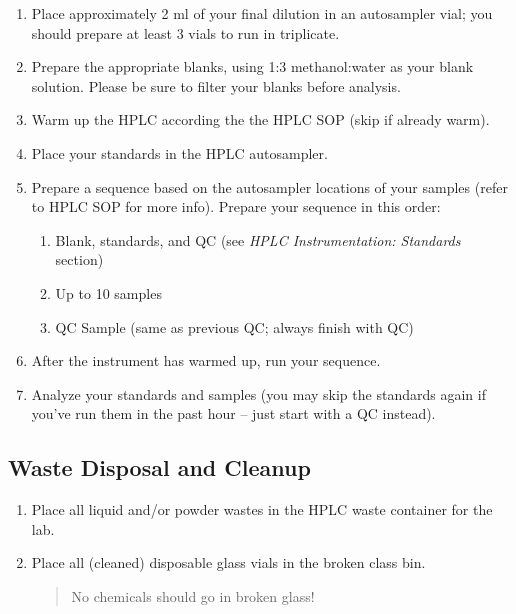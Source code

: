 \documentclass[]{tufte-book}
\providecommand{\tightlist}{%
  \setlength{\itemsep}{0pt}\setlength{\parskip}{0pt}}
\begin{document}
\begin{enumerate}
\def\labelenumi{\arabic{enumi}.}
\tightlist
\item
  Place approximately 2 ml of your final dilution in an autosampler vial; you should prepare at least 3 vials to run in triplicate.
\item
  Prepare the appropriate blanks, using 1:3 methanol:water as your blank solution. Please be sure to filter your blanks before analysis.
\item
  Warm up the HPLC according the the HPLC SOP (skip if already warm).
\item
  Place your standards in the HPLC autosampler.
\item
  Prepare a sequence based on the autosampler locations of your samples (refer to HPLC SOP for more info). Prepare your sequence in this order:

  \begin{enumerate}
  \def\labelenumii{\arabic{enumii}.}
  \tightlist
  \item
    Blank, standards, and QC (see \emph{HPLC \textbar{} Instrumentation: Standards} section)
  \item
    Up to 10 samples
  \item
    QC Sample (same as previous QC; always finish with QC)
  \end{enumerate}
\item
  After the instrument has warmed up, run your sequence.
\item
  Analyze your standards and samples (you may skip the standards again if you've run them in the past hour -- just start with a QC instead).
\end{enumerate}

\hypertarget{waste-disposal-and-cleanup}{%
\subsection{Waste Disposal and Cleanup}\label{waste-disposal-and-cleanup}}

\begin{enumerate}
\def\labelenumi{\arabic{enumi}.}
\item
  Place all liquid and/or powder wastes in the HPLC waste container for the lab.
\item
  Place all (cleaned) disposable glass vials in the broken class bin.

  \begin{quote}
  No chemicals should go in broken glass!
  \end{quote}
\end{enumerate}
\end{document}
